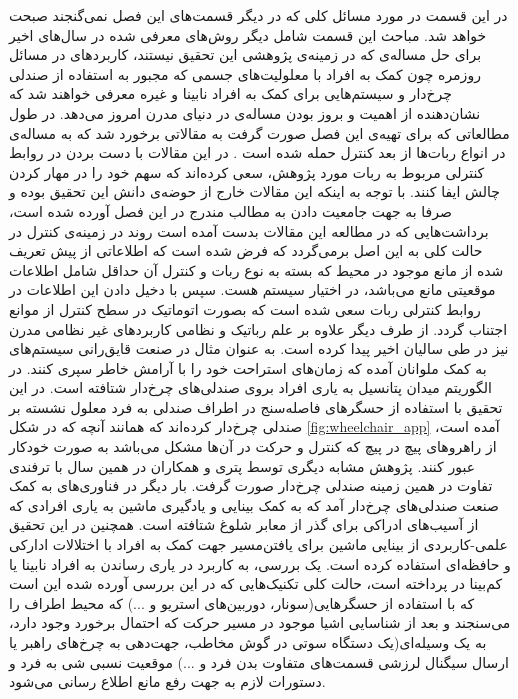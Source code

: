 در این قسمت در مورد مسائل کلی که در دیگر قسمت‌های این فصل نمی‌گنجند صبحت خواهد شد. مباحث این قسمت شامل دیگر روش‌های معرفی شده در سال‌های اخیر برای حل مساله‌ی  که در زمینه‌ی پژوهشی این تحقیق نیستند، کاربردهای  در مسائل روزمره چون کمک به افراد با معلولیت‌های جسمی که مجبور به استفاده از صندلی چرخ‌دار و سیستم‌هایی برای کمک به افراد نابینا و غیره معرفی خواهند شد که نشان‌دهنده‌ از اهمیت و بروز بودن مساله‌ی  در دنیای مدرن امروز می‌دهد.
در طول مطالعاتی که برای تهیه‌ی این فصل صورت گرفت به مقالاتی برخورد شد که به مساله‌ی  در انواع ربات‌ها از بعد کنترل حمله شده است
\cite{geng2013obstacle, dong2015obstacle, yao2015real, yang2016nonlinear}.
در این مقالات با دست بردن در روابط کنترلی مربوط به ربات مورد پژوهش، سعی کرده‌اند که سهم خود را در مهار کردن چالش  ایفا کنند. با توجه به اینکه این مقالات خارج از حوضه‌ی دانش این تحقیق بوده و صرفا به جهت جامعیت دادن به مطالب مندرج در این فصل آورده شده است، برداشت‌هایی که در مطالعه این مقالات بدست آمده است روند  در زمینه‌ی کنترل در حالت کلی به این اصل برمی‌گردد که فرض شده است که اطلاعاتی از پیش تعریف شده از مانع موجود در محیط که بسته به نوع ربات و کنترل آن حداقل شامل اطلاعات موقعیتی مانع می‌باشد، در اختیار سیستم هست. سپس با دخیل دادن این اطلاعات در روابط کنترلی ربات سعی شده است که بصورت اتوماتیک در سطح کنترل از موانع اجتناب گردد.
از طرف دیگر  علاوه بر علم رباتیک و نظامی کاربردهای غیر نظامی مدرن نیز در طی سالیان اخیر پیدا کرده است. به عنوان مثال در صنعت قایق‌رانی سیستم‌های  به کمک ملوانان آمده که زمان‌های استراحت خود را با آرامش خاطر سپری کنند.
در  الگوریتم میدان پتانسیل به یاری افراد بروی صندلی‌های چرخ‌دار شتافته است. در این تحقیق با استفاده از حسگرهای فاصله‌سنج در اطراف صندلی به فرد معلول نشسته بر صندلی چرخ‌دار کرده‌اند که همانند آنچه که در شکل \ref{fig:wheelchair_app} آمده است، از راهروهای پیچ در پیچ که کنترل و حرکت در آن‌ها مشکل می‌باشد به صورت خودکار عبور کنند. پژوهش مشابه دیگری توسط پتری و همکاران در همین سال با ترفندی تفاوت در همین زمینه‌ صندلی چرخ‌دار صورت گرفت.
بار دیگر در  فناوری‌های  به کمک صنعت صندلی‌های چرخ‌دار آمد که به کمک بینایی و یادگیری ماشین به یاری افرادی که از آسیب‌های ادراکی برای گذر از معابر شلوغ شتافته است. همچنین در این تحقیق علمی-کاربردی از بینایی ماشین برای یافتن‌مسیر جهت کمک به افراد با اختلالات ادارکی و حافظه‌ای استفاده کرده است. یک بررسی، به کاربرد  در یاری رساندن به افراد نابینا یا کم‌بینا در  پرداخته است، حالت کلی تکنیک‌هایی که در این بررسی آورده شده این است که با استفاده از حسگر‌هایی(سونار، دوربین‌های استریو و ...) که محیط اطراف را می‌سنجند و بعد از شناسایی اشیا موجود در مسیر حرکت که احتمال برخورد وجود دارد، به یک وسیله‌ای(یک دستگاه سوتی در گوش مخاطب، جهت‌دهی به چرخ‌های راهبر یا ارسال سیگنال لرزشی قسمت‌های متفاوت بدن فرد و ...) موقعیت نسبی شی به فرد و دستورات لازم به جهت رفع مانع اطلاع رسانی می‌شود.

